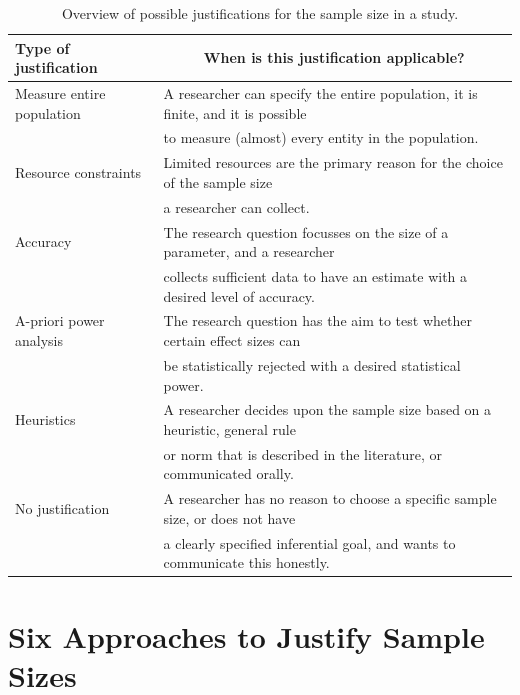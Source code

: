 \documentclass[
  english,
  ,jou, a4paper,floatsintext]{apa6}
\begin{document}
\begin{table}[tbp]

\begin{center}
\begin{threeparttable}

\caption{\label{tab:table-pow-just}Overview of possible justifications for the sample size in a study.}

\begin{tabular}{ll}
\toprule
Type of justification & \multicolumn{1}{c}{When is this justification applicable?}\\
\midrule
Measure entire population & A researcher can specify the entire population, it is finite, and it is possible\\
 & to measure (almost) every entity in the population.\\ \midrule
Resource constraints & Limited resources are the primary reason for the choice of the sample size\\
 & a researcher can collect.\\ \midrule
Accuracy & The research question focusses on the size of a parameter, and a researcher\\
 & collects sufficient data to have an estimate with a desired level of accuracy.\\ \midrule
A-priori power analysis & The research question has the aim to test whether certain effect sizes can\\
 & be statistically rejected with a desired statistical power.\\ \midrule
Heuristics & A researcher decides upon the sample size based on a heuristic, general rule\\
 & or norm that is described in the literature, or communicated orally.\\ \midrule
No justification & A researcher has no reason to choose a specific sample size, or does not have\\
 & a clearly specified inferential goal, and wants to communicate this honestly.\\
\bottomrule
\end{tabular}

\end{threeparttable}
\end{center}

\end{table}

\hypertarget{six-approaches-to-justify-sample-sizes}{%
\section{Six Approaches to Justify Sample Sizes}\label{six-approaches-to-justify-sample-sizes}}
\end{document}
